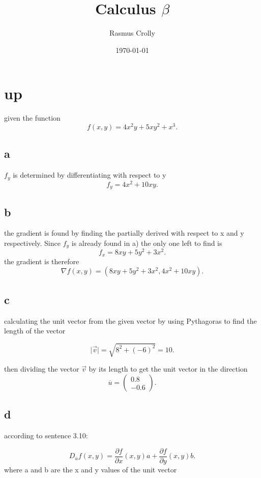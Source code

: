 \documentclass[12pt,a4paper]{article}
\title{Calculus $\beta$}
\author{Rasmus Crolly}
\date{\today}
\begin{document}
\maketitle
	
\section{up}

given the function \[
	f\left( x,y \right) = 4x^2y+5xy^2+x^3
.\] 

\subsection{a}


$f_{y}$ is determined by differentiating with respect to y \[
f_{y}=4x^2+10xy
.\] 

\subsection{b}
the gradient is found by finding the partially derived with respect to x and y respectively. Since $f_{y}$ is already found in a) the only one left to find is \[
f_{x}=8xy+5y^2+3x^2
.\] 
the gradient is therefore \[
\nabla f(x,y) = (8xy+5y^2+3x^2,4x^2+10xy) 
.\] 



\subsection{c}
calculating the unit vector from the given vector by using Pythagoras to find the length of the vector

\[
	 \mid \vec{v} \mid   =\sqrt{8^2+(-6)^2} = 10
.\] 

then dividing the vector $\vec{v}$ by its length to get the unit vector in the direction \[
\overline{u}=\begin{pmatrix} 0.8\\ -0.6 \end{pmatrix}
.\] 


\subsection{d}

according to sentence 3.10:

\[
	D_{\overline{u}}f(x,y)=\frac{\partial f}{\partial x} (x,y)a+\frac{\partial f}{\partial y} (x,y)b
.\]
where a and b are the x and y values of the unit vector
\end{document}
